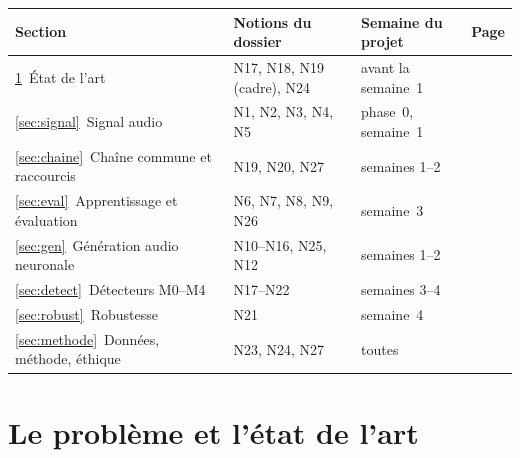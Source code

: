 \documentclass[10pt,a4paper]{article}
\begin{document}
\begin{center}\small
\begin{tabularx}{\textwidth}{@{}l X l r@{}}
\toprule
\textbf{Section} & \textbf{Notions du dossier} & \textbf{Semaine du projet} & \textbf{Page}\\
\midrule
\ref{sec:etat}\ État de l'art & N17, N18, N19 (cadre), N24 & avant la semaine~1 & \pageref{sec:etat}\\
\ref{sec:signal}\ Signal audio & N1, N2, N3, N4, N5 & phase~0, semaine~1 & \pageref{sec:signal}\\
\ref{sec:chaine}\ Chaîne commune et raccourcis & N19, N20, N27 & semaines 1--2 & \pageref{sec:chaine}\\
\ref{sec:eval}\ Apprentissage et évaluation & N6, N7, N8, N9, N26 & semaine~3 & \pageref{sec:eval}\\
\ref{sec:gen}\ Génération audio neuronale & N10--N16, N25, N12 & semaines 1--2 & \pageref{sec:gen}\\
\ref{sec:detect}\ Détecteurs M0--M4 & N17--N22 & semaines 3--4 & \pageref{sec:detect}\\
\ref{sec:robust}\ Robustesse & N21 & semaine~4 & \pageref{sec:robust}\\
\ref{sec:methode}\ Données, méthode, éthique & N23, N24, N27 & toutes & \pageref{sec:methode}\\
\bottomrule
\end{tabularx}
\end{center}

\section{Le problème et l'état de l'art}\label{sec:etat}
\end{document}
